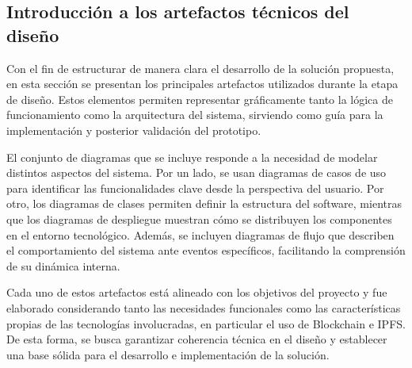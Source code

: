 \subsection{Introducción a los artefactos técnicos del diseño}
Con el fin de estructurar de manera clara el desarrollo de la solución propuesta, en esta sección se presentan los principales artefactos utilizados durante la etapa de diseño. Estos elementos permiten representar gráficamente tanto la lógica de funcionamiento como la arquitectura del sistema, sirviendo como guía para la implementación y posterior validación del prototipo.

El conjunto de diagramas que se incluye responde a la necesidad de modelar distintos aspectos del sistema. Por un lado, se usan diagramas de casos de uso para identificar las funcionalidades clave desde la perspectiva del usuario. Por otro, los diagramas de clases permiten definir la estructura del software, mientras que los diagramas de despliegue muestran cómo se distribuyen los componentes en el entorno tecnológico. Además, se incluyen diagramas de flujo que describen el comportamiento del sistema ante eventos específicos, facilitando la comprensión de su dinámica interna.

Cada uno de estos artefactos está alineado con los objetivos del proyecto y fue elaborado considerando tanto las necesidades funcionales como las características propias de las tecnologías involucradas, en particular el uso de Blockchain e IPFS. De esta forma, se busca garantizar coherencia técnica en el diseño y establecer una base sólida para el desarrollo e implementación de la solución.

